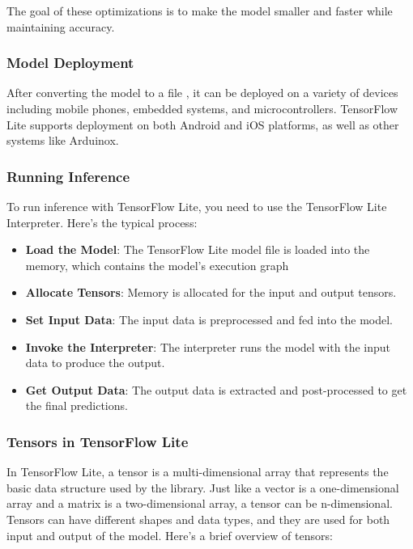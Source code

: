 The goal of these optimizations is to make the model smaller and faster while maintaining accuracy.

\subsubsection{Model Deployment}
After converting the model to a file , it can be deployed on a variety of devices including mobile phones, embedded systems, and microcontrollers. TensorFlow Lite supports deployment on both Android and iOS platforms, as well as other systems like Arduinox.

\subsubsection{Running Inference}
To run inference with TensorFlow Lite, you need to use the TensorFlow Lite Interpreter. Here’s the typical process:
\begin{itemize}
    \item \textbf{Load the Model}: The TensorFlow Lite model file  is loaded into the memory, which contains the model's execution graph
    \item \textbf{Allocate Tensors}: Memory is allocated for the input and output tensors.
    \item \textbf{Set Input Data}: The input data is preprocessed and fed into the model.
    \item \textbf{Invoke the Interpreter}: The interpreter runs the model with the input data to produce the output.
    \item \textbf{Get Output Data}: The output data is extracted and post-processed to get the final predictions.
\end{itemize}



\subsubsection{Tensors in TensorFlow Lite}
In TensorFlow Lite, a tensor is a multi-dimensional array that represents the basic data structure used by the library. Just like a vector is a one-dimensional array and a matrix is a two-dimensional array, a tensor can be n-dimensional. Tensors can have different shapes and data types, and they are used for both input and output of the model. Here's a brief overview of tensors:

